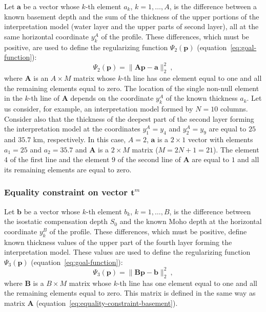 \documentclass[manuscript]{geophysics}
\begin{document}
Let $\mathbf{a}$ be a vector whose $k$-th element $a_{k}$,
$k = 1, \dots, A$, is the difference between a known basement depth and
the sum of the thickness of the upper portions of the interpretation model
(water layer and the upper parts of second layer), all at the same
horizontal coordinate $y^{A}_{k}$ of the profile. 
These differences, which must be positive, are used to define 
the regularizing function $\Psi_{2}(\mathbf{p})$ 
(equation~\ref{eq:goal-function}):
\begin{equation}
\Psi_{2}(\mathbf{p}) = \| \mathbf{A}\mathbf{p} - \mathbf{a} \|_{2}^{2} \: ,
\label{eq:equality-constraint-basement}
\end{equation}
where $\mathbf{A}$ is an $A \times M$ matrix whose $k$-th line has one element 
equal to one and all the remaining elements equal to zero. The location of the
single non-null element in the $k$-th line of $\mathbf{A}$ depends on the coordinate
$y^{A}_{k}$ of the known thickness $a_{k}$. Let us consider, 
for example, an interpretation model formed by $N = 10$ columns. Consider also that 
the thickness of the deepest part of the second layer forming the interpretation model 
at the coordinates $y^{A}_{1} = y_{4}$ and $y^{A}_{2} = y_{9}$ 
are equal to $25$ and $35.7$ km, respectively. In this case, $A = 2$,
$\mathbf{a}$ is a $2 \times 1$ vector with elements $a_{1} = 25$ and $a_{2} = 35.7$
and $\mathbf{A}$ is a $2 \times M$ matrix ($M = 2N + 1 = 21$). The element $4$ of the
first line and the element $9$ of the second line of $\mathbf{A}$ are equal to $1$ and
all its remaining elements are equal to zero.

\subsubsection*{Equality constraint on vector $\mathbf{t}^{m}$}

Let $\mathbf{b}$ be a vector whose $k$-th element $b_{k}$,
$k = 1, \dots, B$, is the difference between the isostatic compensation depth
$S_{0}$ and the known Moho depth at the horizontal coordinate $y^{B}_{k}$ of the
profile. These differences, which must be positive, define known thickness values
of the upper part of the fourth layer forming the interpretation model.
These values are used to define the 
regularizing function $\Psi_{3}(\mathbf{p})$ (equation~\ref{eq:goal-function}):
\begin{equation}
\Psi_{3}(\mathbf{p}) = \| \mathbf{B}\mathbf{p} - \mathbf{b} \|_{2}^{2} \: ,
\label{eq:equality-constraint-moho}
\end{equation}
where $\mathbf{B}$ is a $B \times M$ matrix whose $k$-th line has one element 
equal to one and all the remaining elements equal to zero. This matrix is defined 
in the same way as matrix $\mathbf{A}$ (equation~\ref{eq:equality-constraint-basement}).
\end{document}
